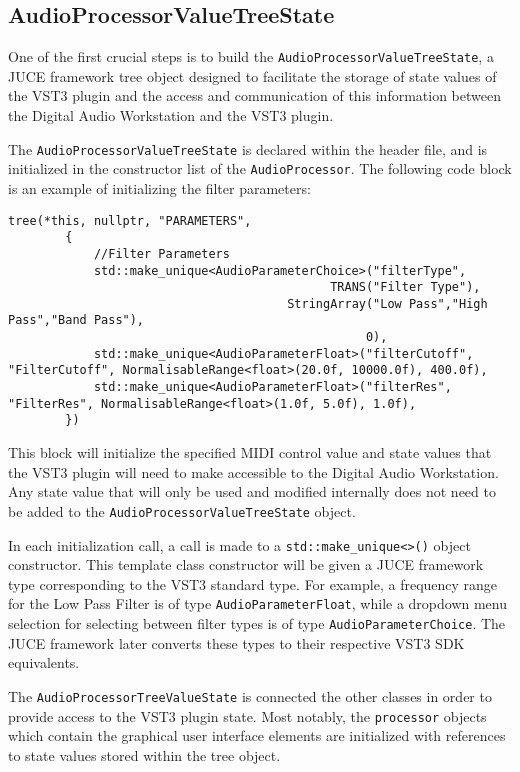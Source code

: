 \documentclass[a4paper,12pt]{report}
\begin{document}
\subsection{AudioProcessorValueTreeState}
One of the first crucial steps is to build the \texttt{AudioProcessorValueTreeState}, a JUCE framework tree object designed to facilitate the storage of state values of the VST3 plugin and the access and communication of this information between the Digital Audio Workstation and the VST3 plugin.

The \texttt{AudioProcessorValueTreeState} is declared within the header file, and is initialized in the constructor list of the \texttt{AudioProcessor}. The following code block is an example of initializing the filter parameters:

\begin{lstlisting}
tree(*this, nullptr, "PARAMETERS",
        {   
            //Filter Parameters
            std::make_unique<AudioParameterChoice>("filterType",
                                             TRANS("Filter Type"),
                                       StringArray("Low Pass","High Pass","Band Pass"),
                                                  0),
            std::make_unique<AudioParameterFloat>("filterCutoff", "FilterCutoff", NormalisableRange<float>(20.0f, 10000.0f), 400.0f),
            std::make_unique<AudioParameterFloat>("filterRes", "FilterRes", NormalisableRange<float>(1.0f, 5.0f), 1.0f),
        })
\end{lstlisting}

This block will initialize the specified MIDI control value and state values that the VST3 plugin will need to make accessible to the Digital Audio Workstation. Any state value that will only be used and modified internally does not need to be added to the \texttt{AudioProcessorValueTreeState} object.

In each initialization call, a call is made to a \texttt{std::make\_unique<>()} object constructor. This template class constructor will be given a JUCE framework type corresponding to the VST3 standard type. For example, a frequency range for the Low Pass Filter is of type \texttt{AudioParameterFloat}, while a dropdown menu selection for selecting between filter types is of type \texttt{AudioParameterChoice}. The JUCE framework later converts these types to their respective VST3 SDK equivalents.

The \texttt{AudioProcessorTreeValueState} is connected the other classes in order to provide access to the VST3 plugin state. Most notably, the \texttt{processor} objects which contain the graphical user interface elements are initialized with references to state values stored within the tree object.
\end{document}
